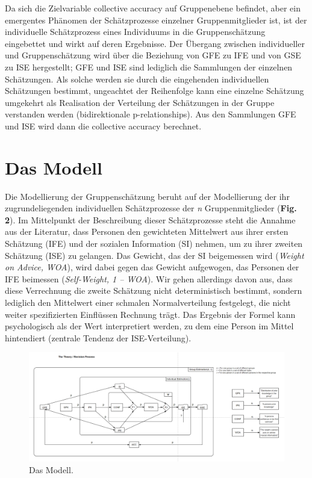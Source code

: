 \documentclass[
  man,floatsintext]{apa6}
\begin{document}
Da sich die Zielvariable collective accuracy auf Gruppenebene befindet, aber ein emergentes Phänomen der Schätzprozesse einzelner Gruppenmitglieder ist, ist der individuelle Schätzprozess eines Individuums in die Gruppenschätzung eingebettet und wirkt auf deren Ergebnisse. Der Übergang zwischen individueller und Gruppenschätzung wird über die Beziehung von GFE zu IFE und von GSE zu ISE hergestellt; GFE und ISE sind lediglich die Sammlungen der einzelnen Schätzungen. Als solche werden sie durch die eingehenden individuellen Schätzungen bestimmt, ungeachtet der Reihenfolge kann eine einzelne Schätzung umgekehrt als Realisation der Verteilung der Schätzungen in der Gruppe verstanden werden (bidirektionale p-relationships). Aus den Sammlungen GFE und ISE wird dann die collective accuracy berechnet.

\section{Das Modell}\label{das-modell}

Die Modellierung der Gruppenschätzung beruht auf der Modellierung der ihr zugrundeliegenden individuellen Schätzprozesse der \emph{n} Gruppenmitglieder (\textbf{Fig. 2}). Im Mittelpunkt der Beschreibung dieser Schätzprozesse steht die Annahme aus der Literatur, dass Personen den gewichteten Mittelwert aus ihrer ersten Schätzung (IFE) und der sozialen Information (SI) nehmen, um zu ihrer zweiten Schätzung (ISE) zu gelangen. Das Gewicht, das der SI beigemessen wird (\emph{Weight on Advice, WOA}), wird dabei gegen das Gewicht aufgewogen, das Personen der IFE beimessen (\emph{Self-Weight, 1 -- WOA}). Wir gehen allerdings davon aus, dass diese Verrechnung die zweite Schätzung nicht deterministisch bestimmt, sondern lediglich den Mittelwert einer schmalen Normalverteilung festgelegt, die nicht weiter spezifizierten Einflüssen Rechnung trägt. Das Ergebnis der Formel kann psychologisch als der Wert interpretiert werden, zu dem eine Person im Mittel hintendiert (zentrale Tendenz der ISE-Verteilung).



\begin{figure}
\centering
\includegraphics{Abbildungen/VAST_Modell.png}
\caption{\label{fig:my-figure2}Das Modell.}
\end{figure}
\end{document}
